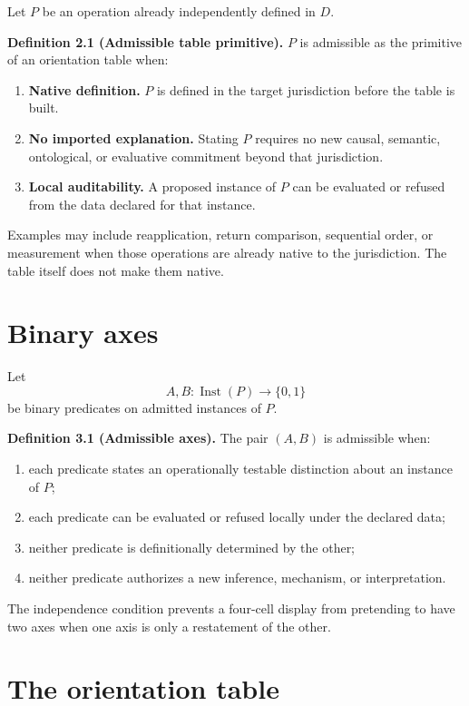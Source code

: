 \documentclass[11pt]{article}
\newcommand{\Inst}{\operatorname{Inst}}
\begin{document}
Let $P$ be an operation already independently defined in $D$.

\textbf{Definition 2.1 (Admissible table primitive).}
$P$ is admissible as the primitive of an orientation table when:
\begin{enumerate}
\item \textbf{Native definition.} $P$ is defined in the target jurisdiction before the table is built.
\item \textbf{No imported explanation.} Stating $P$ requires no new causal, semantic, ontological, or evaluative commitment beyond that jurisdiction.
\item \textbf{Local auditability.} A proposed instance of $P$ can be evaluated or refused from the data declared for that instance.
\end{enumerate}

Examples may include reapplication, return comparison, sequential order, or measurement when those operations are already native to the jurisdiction. The table itself does not make them native.

\section{Binary axes}

Let
\[
A,B:\Inst(P)\longrightarrow\{0,1\}
\]
be binary predicates on admitted instances of $P$.

\textbf{Definition 3.1 (Admissible axes).}
The pair $(A,B)$ is admissible when:
\begin{enumerate}
\item each predicate states an operationally testable distinction about an instance of $P$;
\item each predicate can be evaluated or refused locally under the declared data;
\item neither predicate is definitionally determined by the other;
\item neither predicate authorizes a new inference, mechanism, or interpretation.
\end{enumerate}

The independence condition prevents a four-cell display from pretending to have two axes when one axis is only a restatement of the other.

\section{The orientation table}
\end{document}
